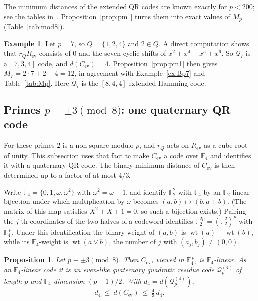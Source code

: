 \documentclass[12pt,letterpaper]{article}
\newtheorem{proposition}[theorem]{Proposition}
\theoremstyle{definition}
\newtheorem{example}[theorem]{Example}
\theoremstyle{remark}
\numberwithin{equation}{section}
\newcommand{\F}{\mathbb{F}}
\newcommand{\wt}{\operatorname{wt}}
\newcommand{\Cev}{C_{\mathrm{ev}}}
\begin{document}
The minimum distances of the extended QR codes are known exactly for $p<200$; see
the tables in~\cite[Ch.~9]{TTAAJ17}. Proposition~\ref{prop:pm1} turns them into exact
values of $M_p$ (Table~\ref{tab:mod8}).

\begin{example}\label{ex:pm1p7}
Let $p=7$, so $Q=\{1,2,4\}$ and $2\in Q$. A direct computation shows that
$r_QR_{\mathrm{ev}}$ consists of $0$ and the seven cyclic shifts of
$x^2+x^4+x^5+x^6$. So $\mathcal Q_7$ is a $[7,3,4]$ code, and $d(\Cev)=4$.
Proposition~\ref{prop:pm1} then gives $M_7=2\cdot7+2-4=12$, in agreement with
Example~\ref{ex:Bp7} and Table~\ref{tab:Mp}. Here $\widehat{\mathcal Q}_7$ is the
$[8,4,4]$ extended Hamming code.
\end{example}

\subsection{\texorpdfstring{Primes $p\equiv\pm3\pmod 8$: one quaternary QR code}{Primes p = +-3 (mod 8): one quaternary QR code}}

For these primes $2$ is a non-square modulo $p$, and $r_Q$ acts on
$R_{\mathrm{ev}}$ as a cube root of unity. This subsection uses that fact to make
$\Cev$ a code over $\F_4$ and identifies it with a quaternary QR code. The binary
minimum distance of $\Cev$ is then determined up to a factor of at most $4/3$.

Write $\F_4=\{0,1,\omega,\omega^2\}$ with $\omega^2=\omega+1$, and identify
$\F_2^2$ with $\F_4$ by an $\F_2$-linear bijection under which multiplication by
$\omega$ becomes $(a,b)\mapsto(b,a+b)$. (The matrix of this map satisfies
$X^2+X+1=0$, so such a bijection exists.) Pairing the $j$-th coordinates of the two
halves of a codeword identifies $\F_2^{2p}=(\F_2^2)^p$ with $\F_4^{\,p}$. Under
this identification the binary weight of $(a,b)$ is
$\wt(a)+\wt(b)$, while its $\F_4$-weight is $\wt(a\vee b)$, the number of $j$ with
$(a_j,b_j)\ne(0,0)$.

\begin{proposition}\label{prop:pm3}
Let $p\equiv\pm3\pmod8$. Then $\Cev$, viewed in $\F_4^{\,p}$, is $\F_4$-linear. As an
$\F_4$-linear code it is an even-like quaternary quadratic residue code
$\mathcal Q^{(4)}_p$ of length $p$ and $\F_4$-dimension $(p-1)/2$. With
$d_4=d(\mathcal Q^{(4)}_p)$,
\[
d_4\ \le\ d(\Cev)\ \le\ \tfrac43\,d_4 .
\]
\end{proposition}
\end{document}
